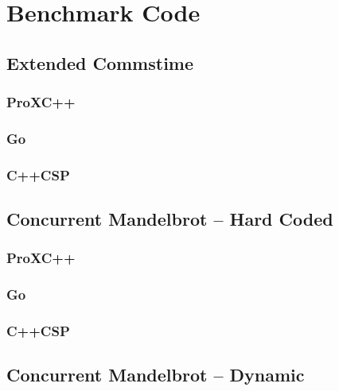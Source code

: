 

\chapter{Benchmark Code}
\label{ch:benchmark_code}

\section*{Extended Commstime}

\subsection*{ProXC++}

\subsection*{Go}

\subsection*{C++CSP}

\section*{Concurrent Mandelbrot -- Hard Coded}

\subsection*{ProXC++}

\subsection*{Go}

\subsection*{C++CSP}


\section*{Concurrent Mandelbrot -- Dynamic}


